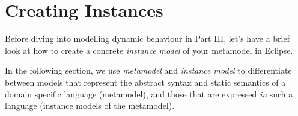 \newpage
\genHeader

\section{Creating Instances}
\hypertarget{creatingInstance common}{}

Before diving into modelling dynamic behaviour in Part III, let's have a brief look at how to create a concrete \emph{instance model} of your metamodel
in Eclipse.

In the following section, we use \emph{metamodel} and \emph{instance model} to differentiate between models that represent the abstract syntax and static
semantics of a domain specific language (metamodel), and those that are expressed \emph{in} such a language (instance models of the metamodel).

